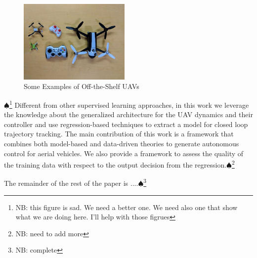 \documentclass[letterpaper, 10 pt, conference]{ieeeconf}  %
\newcommand\NB[1]{$\spadesuit$\footnote{NB: #1}}
\begin{document}
\begin{figure}[ht]
    \includegraphics[width=0.48\textwidth]{images/uavs.jpg}
    \caption{Some Examples of Off-the-Shelf UAVs}
    \label{fig:uavs}
\end{figure}
\NB{this figure is sad. We need a better one. We need also one that show what we are doing here. I'll help with those figrues}
Different from other supervised learning approaches, in this work we leverage the knowledge about the generalized architecture for the UAV dynamics and their controller and use regression-based techniques to extract a model for closed loop trajectory tracking. The main contribution of this work is a framework that combines both model-based and data-driven theories to generate autonomous control for aerial vehicles. We also provide a framework to assess the quality of the training data with respect to the output decision from the regression.\NB{need to add more}

The remainder of the rest of the paper is ....\NB{complete}
 
 



\end{document}

